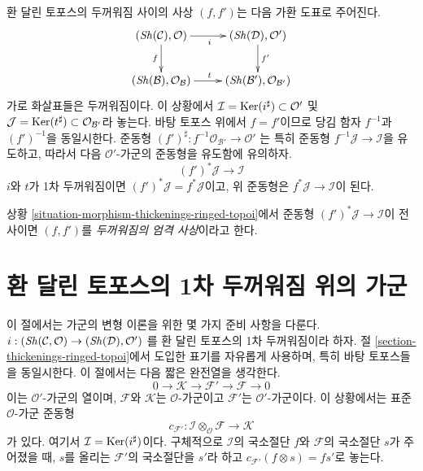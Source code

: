 \begin{situation}
\label{situation-morphism-thickenings-ringed-topoi}
환 달린 토포스의 두꺼워짐 사이의 사상 $(f, f')$는 다음 가환 도표로
주어진다.
\begin{equation}
\label{equation-morphism-thickenings-ringed-topoi}
\vcenter{
\xymatrix{
(\Sh(\mathcal{C}), \mathcal{O}) \ar[r]_i \ar[d]_f &
(\Sh(\mathcal{D}), \mathcal{O}') \ar[d]^{f'} \\
(\Sh(\mathcal{B}), \mathcal{O}_\mathcal{B}) \ar[r]^t &
(\Sh(\mathcal{B}'), \mathcal{O}_{\mathcal{B}'})
}
}
\end{equation}
가로 화살표들은 두꺼워짐이다. 이 상황에서
$\mathcal{I} = \mathop{\mathrm{Ker}}(i^\sharp) \subset \mathcal{O}'$ 및
$\mathcal{J} = \mathop{\mathrm{Ker}}(t^\sharp) \subset \mathcal{O}_{\mathcal{B}'}$라
놓는다. 바탕 토포스 위에서 $f = f'$이므로 당김 함자 $f^{-1}$과
$(f')^{-1}$을 동일시한다. 준동형
$(f')^\sharp : f^{-1}\mathcal{O}_{\mathcal{B}'} \to \mathcal{O}'$
는 특히 준동형 $f^{-1}\mathcal{J} \to \mathcal{I}$을 유도하고, 따라서
다음 $\mathcal{O}'$-가군의 준동형을 유도함에 유의하자.
$$
(f')^*\mathcal{J} \longrightarrow \mathcal{I}
$$
$i$와 $t$가 1차 두꺼워짐이면 $(f')^*\mathcal{J} = f^*\mathcal{J}$이고,
위 준동형은 $f^*\mathcal{J} \to \mathcal{I}$이 된다.
\end{situation}

\begin{definition}
\label{definition-strict-morphism-thickenings-ringed-topoi}
상황 \ref{situation-morphism-thickenings-ringed-topoi}에서 준동형
$(f')^*\mathcal{J} \longrightarrow \mathcal{I}$이 전사이면
$(f, f')$를 {\it 두꺼워짐의 엄격 사상}이라고 한다.
\end{definition}








\section{환 달린 토포스의 1차 두꺼워짐 위의 가군}
\label{section-modules-thickenings-ringed-topoi}

\noindent
이 절에서는 가군의 변형 이론을 위한 몇 가지 준비 사항을 다룬다.
$i : (\mathop{\mathit{Sh}}\nolimits(\mathcal{C}, \mathcal{O}) \to (\mathop{\mathit{Sh}}\nolimits(\mathcal{D}), \mathcal{O}')$
를 환 달린 토포스의 1차 두꺼워짐이라 하자. 절
\ref{section-thickenings-ringed-topoi}에서 도입한 표기를 자유롭게
사용하며, 특히 바탕 토포스들을 동일시한다. 이 절에서는 다음
짧은 완전열을 생각한다.
\begin{equation}
\label{equation-extension-ringed-topoi}
0 \to \mathcal{K} \to \mathcal{F}' \to \mathcal{F} \to 0
\end{equation}
이는 $\mathcal{O}'$-가군의 열이며, $\mathcal{F}$와 $\mathcal{K}$는
$\mathcal{O}$-가군이고 $\mathcal{F}'$는 $\mathcal{O}'$-가군이다.
이 상황에서는 표준 $\mathcal{O}$-가군 준동형
$$
c_{\mathcal{F}'} :
\mathcal{I} \otimes_\mathcal{O} \mathcal{F}
\longrightarrow
\mathcal{K}
$$
가 있다. 여기서 $\mathcal{I} = \mathop{\mathrm{Ker}}(i^\sharp)$이다. 구체적으로
$\mathcal{I}$의 국소절단 $f$와 $\mathcal{F}$의 국소절단 $s$가
주어졌을 때, $s$를 올리는 $\mathcal{F}'$의 국소절단을 $s'$라 하고
$c_{\mathcal{F}'}(f \otimes s) = fs'$로 놓는다.

